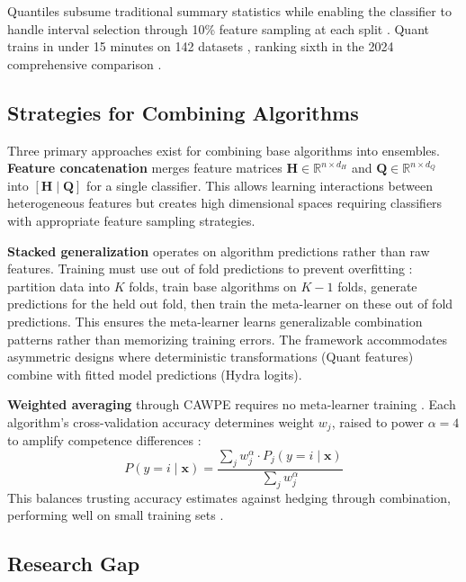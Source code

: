 \documentclass[pdflatex,sn-basic]{sn-jnl}           %
\theoremstyle{thmstyleone}%
\theoremstyle{thmstyletwo}%
\theoremstyle{thmstylethree}%
\begin{document}
Quantiles subsume traditional summary statistics \citep[p.~2378]{quant} while enabling the classifier to handle interval selection through 10\% feature sampling at each split \citep[Section~4.2.6, p.~2387]{quant}. Quant trains in under 15 minutes on 142 datasets \citep[p.~2390]{quant}, ranking sixth in the 2024 comprehensive comparison \citep[Table~14, p.~2008]{bakeoff-redux}.

\subsection{Strategies for Combining Algorithms}

Three primary approaches exist for combining base algorithms into ensembles. \textbf{Feature concatenation} merges feature matrices $\mathbf{H} \in \mathbb{R}^{n \times d_H}$ and $\mathbf{Q} \in \mathbb{R}^{n \times d_Q}$ into $[\mathbf{H} \mid \mathbf{Q}]$ for a single classifier. This allows learning interactions between heterogeneous features but creates high dimensional spaces requiring classifiers with appropriate feature sampling strategies.

\textbf{Stacked generalization} \citep{stacked-generalization} operates on algorithm predictions rather than raw features. Training must use out of fold predictions to prevent overfitting \citep[p.~244]{stacked-generalization}: partition data into $K$ folds, train base algorithms on $K-1$ folds, generate predictions for the held out fold, then train the meta-learner on these out of fold predictions. This ensures the meta-learner learns generalizable combination patterns rather than memorizing training errors. The framework accommodates asymmetric designs where deterministic transformations (Quant features) combine with fitted model predictions (Hydra logits).

\textbf{Weighted averaging} through CAWPE requires no meta-learner training \citep{cawpe}. Each algorithm's cross-validation accuracy determines weight $w_j$, raised to power $\alpha=4$ to amplify competence differences \citep[p.~1675]{cawpe}:
\begin{equation}
P(y=i \mid \mathbf{x}) = \frac{\sum_j w_j^\alpha \cdot P_j(y=i \mid \mathbf{x})}{\sum_j w_j^\alpha}
\end{equation}
This balances trusting accuracy estimates against hedging through combination, performing well on small training sets \citep[Table~3, p.~1693]{cawpe}.

\subsection{Research Gap}
\end{document}
